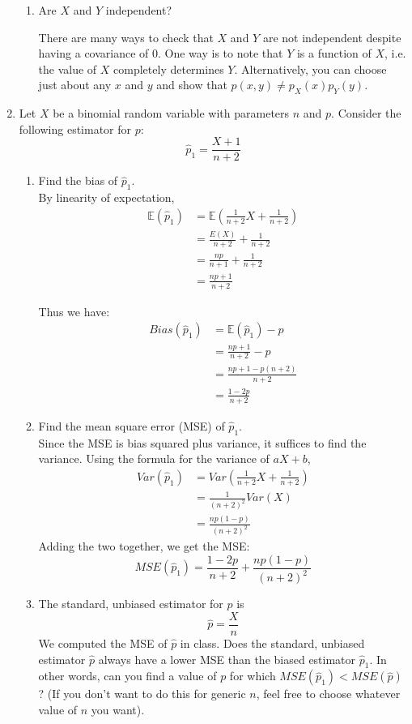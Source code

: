 \documentclass[12pt]{article}
\def\E{{\mathbb E}}
\begin{document}
\begin{enumerate}
\begin{enumerate}
\item Are $X$ and $Y$ independent?

There are many ways to check that $X$ and $Y$ are not independent despite having a covariance of 0. One way is to note that $Y$ is a function of $X$, i.e. the value of $X$ completely determines $Y$. Alternatively, you can choose just about any $x$ and $y$ and show that $p(x,y)\neq p_X(x)p_Y(y)$.
\end{enumerate}

\item Let $X$ be a binomial random variable with parameters $n$ and $p$. Consider the following estimator for $p$:
\[
\hat{p}_1 = \frac{X+1}{n+2}
\]
\begin{enumerate}
\item Find the bias of $\hat{p}_1$.\\

By linearity of expectation,
\begin{align*}
\E(\hat{p}_1) &= \E\left( \frac{1}{n+2}X + \frac{1}{n+2} \right) \\
&= \frac{E(X)}{n+2} + \frac{1}{n+2}\\
&= \frac{np}{n+1} + \frac{1}{n+2}\\
&= \frac{np + 1}{n+2}
\end{align*}

Thus we have:
\begin{align*}
Bias(\hat{p}_1) &= \E(\hat{p}_1) - p \\
&= \frac{np + 1}{n+2} - p \\
&= \frac{np + 1 - p(n+2)}{n+2} \\
&= \frac{1 - 2p}{n+2}
\end{align*}

\item Find the mean square error (MSE) of $\hat{p}_1$.\\

Since the MSE is bias squared plus variance, it suffices to find the variance. Using the formula for the variance of $aX + b$,
\begin{align*}
Var(\hat{p}_1) &= Var\left( \frac{1}{n+2}X + \frac{1}{n+2} \right) \\
&= \frac{1}{(n+2)^2} Var(X) \\
&= \frac{np(1-p)}{(n+2)^2}
\end{align*}
Adding the two together, we get the MSE:
\[
MSE(\hat{p}_1) = \frac{1 - 2p}{n+2} + \frac{np(1-p)}{(n+2)^2}
\]

\item The standard, unbiased estimator for $p$ is 
\[
\hat{p} = \frac{X}{n}
\]
We computed the MSE of $\hat{p}$ in class. Does the standard, unbiased estimator $\hat{p}$ always have a lower MSE than the biased estimator $\hat{p}_1$. In other words, can you find a value of $p$ for which $MSE(\hat{p}_1) < MSE(\hat{p})$? (If you don't want to do this for generic $n$, feel free to choose whatever value of $n$ you want).\\


\end{enumerate}
\end{enumerate}
\end{document}
